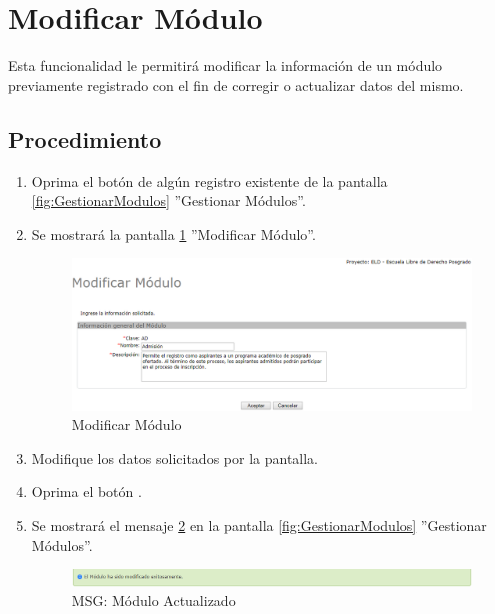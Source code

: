 \hypertarget{cv:modificarModulo}{\section{Modificar Módulo}} \label{sec:modificarModulo}

	Esta funcionalidad le permitirá modificar la información de un módulo previamente registrado con el fin de corregir o actualizar datos del mismo. 

		\subsection{Procedimiento}

			\begin{enumerate}
	
			\item Oprima el botón \IUEditar{} de algún registro existente de la pantalla \ref{fig:GestionarModulos} ''Gestionar Módulos''.
	
			\item Se mostrará la pantalla \ref{fig:modificarModulo} ''Modificar Módulo''.
			
			\begin{figure}[htbp!]
				\begin{center}
					\includegraphics[scale=0.6]{roles/lider/modulos/pantallas/IU5-2modificarModulo}
					\caption{Modificar Módulo}
					\label{fig:modificarModulo}
				\end{center}
			\end{figure}
		
			\item Modifique los datos solicitados por la pantalla.
						
			\item Oprima el botón \IUAceptar.
			
			\item Se mostrará el mensaje \ref{fig:moduloModificado} en la pantalla \ref{fig:GestionarModulos} ''Gestionar Módulos''.
			
			\begin{figure}[htbp!]
				\begin{center}
					\includegraphics[scale=0.6]{roles/lider/modulos/pantallas/IU5-2MSG1}
					\caption{MSG: Módulo Actualizado}
					\label{fig:moduloModificado}
				\end{center}
			\end{figure}
			\end{enumerate}